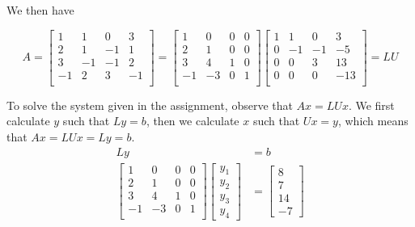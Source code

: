 We then have

\begin{equation*}
    A = \begin{bmatrix}
        1 & 1 & 0 & 3 \\
        2 & 1 & -1 & 1 \\
        3 & -1 & -1 & 2 \\
        -1 & 2 & 3 & -1 \\
    \end{bmatrix}
     = \begin{bmatrix}
        1 & 0 & 0 & 0 \\
        2 & 1 & 0 & 0 \\
        3 & 4 & 1 & 0 \\
        -1 & -3 & 0 & 1 \\
    \end{bmatrix}
    \begin{bmatrix}
        1 & 1 & 0 & 3 \\
        0 & -1 & -1 & -5 \\
        0 & 0 & 3 & 13 \\
        0 & 0 & 0 & -13 \\
    \end{bmatrix}
    = LU
\end{equation*}

To solve the system given in the assignment, observe that $Ax = LUx$. We first calculate $y$ such that $Ly = b$, then we calculate $x$ such that $Ux = y$, which means that $Ax = LUx = Ly = b$.
\begin{align*}
    Ly &= b \\
    \begin{bmatrix}
        1 & 0 & 0 & 0 \\
        2 & 1 & 0 & 0 \\
        3 & 4 & 1 & 0 \\
        -1 & -3 & 0 & 1 \\
    \end{bmatrix}
    \begin{bmatrix}
        y_1 \\ y_2 \\ y_3 \\ y_4
    \end{bmatrix}
    &= \begin{bmatrix}
        8 \\ 7 \\ 14 \\ -7
    \end{bmatrix}
\end{align*}

